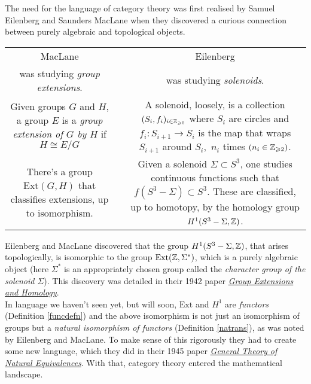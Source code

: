 \vspace*{1em}

\begin{discussion} The need for the language of category theory was first realised by Samuel Eilenberg and Saunders MacLane when they discovered a curious connection between purely algebraic and topological objects.
\begin{center}
    {\renewcommand{\arraystretch}{2}%
    \begin{tabular}{c c c}
    MacLane && Eilenberg\\[-1em]
	was studying \emph{group extensions}. && was studying \emph{solenoids}.\\
	\makecell{Given groups $G$ and $H$, a group $E$ is a\\ \emph{group extension of $G$ by $H$} if $H \cong E/G$} && \makecell{A solenoid, loosely, is a collection $(S_i,f_i)_{i\in \mathbb Z_{\geqslant 0}}$\\ where $S_i$ are circles and $f_i:S_{i+1} \to S_i$ is the map\\ that wraps $S_{i+1}$ around $S_i$,\ $n_i$ times $ (n_i \in \mathbb Z_{\geqslant 2})$.}\\
	\makecell{There's a group $\mathrm{Ext}(G,H)$ that classifies\\ extensions, up to isomorphism.} && \makecell{Given a solenoid $\Sigma \subset S^3$, one studies\\ continuous functions such that $f(S^3 - \Sigma) \subset S^3$.\\ These are classified, up to homotopy,\\ by the homology group $H^1(S^3 - \Sigma,\mathbb Z)$.}
    \end{tabular}}
    \end{center}
\vspace*{0.1in}
Eilenberg and MacLane discovered that the group $H^1(S^3 - \Sigma,\mathbb Z)$, that arises topologically, is isomorphic to the group $\mathrm{Ext}(\mathbb Z,\Sigma^*)$, which is a purely algebraic object (here $\Sigma^*$ is an appropriately chosen group called the \emph{character group of the solenoid $\Sigma$}). This discovery was detailed in their 1942 paper \href{https://www.jstor.org/stable/1968966}{\color{darkblue}\emph{Group Extensions and Homology}}.\\[1em]
In language we haven't seen yet, but will soon, $\mathrm{Ext}$ and $H^1$ are \emph{functors} (Definition \ref{funcdefn}) and the above isomorphism is not just an isomorphism of groups but a \emph{natural isomorphism of functors} (Definition \ref{natrans}), as was noted by Eilenberg and MacLane. To make sense of this rigorously they had to create some new language, which they did in their 1945 paper \href{https://www.jstor.org/stable/1990284}{\color{darkblue}\emph{General Theory of Natural Equivalences}}. With that, category theory entered the mathematical landscape.
\end{discussion}


